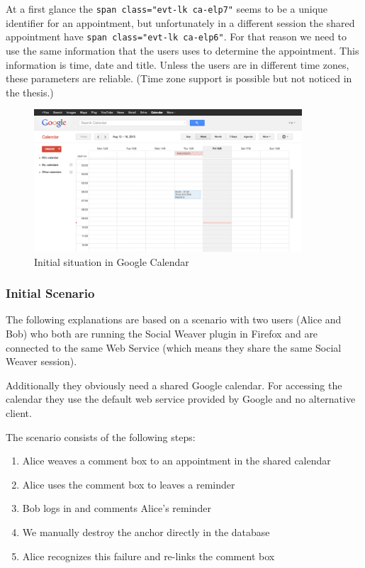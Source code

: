 At a first glance the \verb+span class="evt-lk ca-elp7"+ seems to be a unique identifier for an appointment, but unfortunately in a different session the shared appointment have \verb+span class="evt-lk ca-elp6"+. For that reason we need to use the same information that the users uses to determine the appointment. This information is time, date and title. Unless the users are in different time zones, these parameters are reliable. (Time zone support is possible but not noticed in the thesis.)

\begin{figure}\centering
	\includegraphics[width=10cm]{images/gcal-plain.png}
\caption{Initial situation in Google Calendar}
\label{gcal-plain}
\end{figure}

\subsubsection{Initial Scenario}
The following explanations are based on a scenario with two users (Alice and Bob) who both are running the Social Weaver plugin in Firefox and are connected to the same Web Service (which means they share the same Social Weaver session). 

Additionally they obviously need a shared Google calendar. For accessing the calendar they use the default web service provided by Google and no alternative client. 

The scenario consists of the following steps:
\begin{enumerate}
	\item Alice weaves a comment box to an appointment in the shared calendar
	\item Alice uses the comment box to leaves a reminder
	\item Bob logs in and comments Alice's reminder 
	\item We manually destroy the anchor directly in the database
	\item Alice recognizes this failure and re-links the comment box
\end{enumerate}

